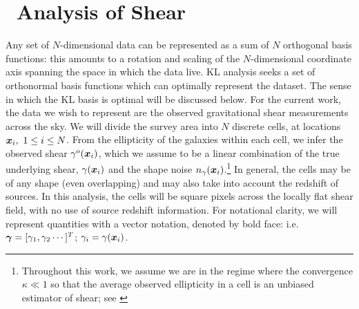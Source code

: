 \section{\KL\ Analysis of Shear}
\label{KL_Intro}
Any set of $N$-dimensional data can be represented as a sum of 
$N$ orthogonal basis functions: this amounts to a rotation and scaling of 
the $N$-dimensional coordinate axis spanning the space in which the data live.
KL analysis seeks a set of orthonormal basis functions which can optimally
represent the dataset.  The sense in which the KL basis is optimal will be
discussed below.  For the current work, the data we wish to represent are the 
observed gravitational shear measurements across the sky.  
We will divide the survey 
area into $N$ discrete cells, at locations $\myvec{x}_i,\ 1\le i \le N$.  
From the ellipticity of the galaxies within each cell, 
we infer the observed shear $\gamma^o(\boldsymbol{x}_i)$, which we assume
to be a linear combination of the true underlying shear, $\gamma(\boldsymbol{x}_i)$
and the shape noise $n_\gamma(\boldsymbol{x}_i)$.\footnote{
Throughout this work, we assume we are in the regime where the convergence
$\kappa \ll 1$ so that the average observed ellipticity in a 
cell is an unbiased estimator of shear; see \citet{Bartelmann01}}
In general, the cells may be of any shape (even overlapping) 
and may also take into account the redshift of sources.
In this analysis, the cells will be square pixels across the locally 
flat shear field, with no use of source redshift information.  
For notational clarity, we will represent quantities with a vector notation,
denoted by bold face: i.e. $\boldsymbol{\gamma} = [\gamma_1,\gamma_2\cdots]^T$; 
$\gamma_i = \gamma(\boldsymbol{x}_i)$. 

